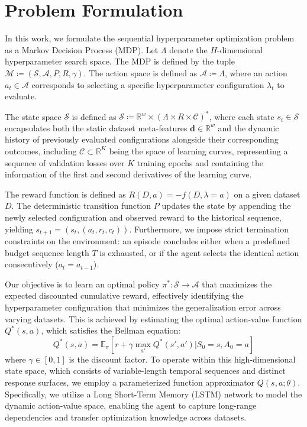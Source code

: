 \section{Problem Formulation}

In this work, we formulate the sequential hyperparameter optimization problem as a Markov Decision Process (MDP). Let $\Lambda$ denote the $H$-dimensional hyperparameter search space. The MDP is defined by the tuple $\mathcal{M}\coloneqq (\mathcal{S}, \mathcal{A}, P, R, \gamma)$. The action space is defined as $\mathcal{A}\coloneqq\Lambda$, where an action $a_t\in\mathcal{A}$ corresponds to selecting a specific hyperparameter configuration $\lambda_t$ to evaluate. 

The state space $\mathcal{S}$ is defined as $\mathcal{S}\coloneqq\mathbb{R}^w\times(\Lambda\times R\times \mathcal{C})^*$, where each state $s_t\in\mathcal{S}$ encapsulates both the static dataset meta-features $\mathbf{d}\in\mathbb{R}^w$ and the dynamic history of previously evaluated configurations alongside their corresponding outcomes, including $\mathcal{C}\subset\mathbb{R}^K$ being the space of learning curves, representing a sequence of validation losses over $K$ training epochs and containing the information of the first and second derivatives of the learning curve. 

The reward function is defined as $R(D, a)=-f(D, \lambda=a)$ on a given dataset $D$. The deterministic transition function $P$ updates the state by appending the newly selected configuration and observed reward to the historical sequence, yielding $s_{t+1}=(s_t,(a_t, r_t, c_t))$. Furthermore, we impose strict termination constraints on the environment: an episode concludes either when a predefined budget sequence length $T$ is exhausted, or if the agent selects the identical action consecutively ($a_t=a_{t-1}$).

Our objective is to learn an optimal policy $\pi^*:\mathcal{S}\rightarrow\mathcal{A}$ that maximizes the expected discounted cumulative reward, effectively identifying the hyperparameter configuration that minimizes the generalization error across varying datasets. This is achieved by estimating the optimal action-value function $Q^*(s,a)$, which satisfies the Bellman equation:
$$Q^*(s, a)=\mathbb{E}_{\pi}\left[r+\gamma\max_{a'}Q^*(s',a')|S_0=s,A_0=a\right]$$
where $\gamma\in[0, 1]$ is the discount factor. To operate within this high-dimensional state space, which consists of variable-length temporal sequences and distinct response surfaces, we employ a parameterized function approximator $Q(s,a;\theta)$. Specifically, we utilize a Long Short-Term Memory (LSTM) network to model the dynamic action-value space, enabling the agent to capture long-range dependencies and transfer optimization knowledge across datasets.